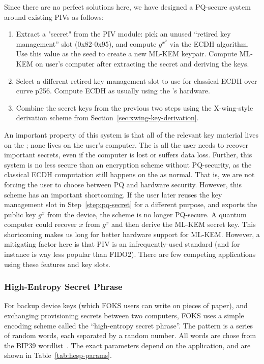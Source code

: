 Since there are no perfect solutions here, we have designed a PQ-secure system
around existing PIVs as follows:

\begin{enumerate}
  \item Extract a "secret" from the PIV module: pick an unused ``retired key management'' slot
  (0x82-0x95), and compute $g^{x^2}$ via the ECDH algorithm. Use this value as the seed
  to create a new ML-KEM keypair. Compute ML-KEM on user's computer after extracting the secret
  and deriving the keys.
  \label{step:pq-secret}

  \item Select a different retired key management slot to use for classical ECDH over curve p256.
  Compute ECDH as usually using the \yubi's hardware.

  \item  Combine the secret keys from the previous two steps using the X-wing-style
  derivation scheme from Section~\ref{sec:xwing-key-derivation}.
\end{enumerate}

An important property of this system is that all of the relevant key material
lives on the \yubi ; none lives on the user's computer. The \yubi is all the
user needs to recover important secrets, even if the computer is lost or suffers
data loss. Further, this system is no less secure than an encryption scheme
without PQ-security, as the classical ECDH computation still happens on the
\yubi{} as normal. That is, we are not forcing the user to choose between PQ and
hardware security.  However, this scheme has an important shortcoming. If the
user later reuses the key management slot in Step~\ref{step:pq-secret} for a
different purpose, and exports the public key $g^x$ from the device, the scheme
is no longer PQ-secure.  A quantum computer could recover $x$ from $g^x$ and
then derive the ML-KEM secret key.  This shortcoming makes us long for better
hardware support for ML-KEM.  However, a mitigating factor here is that PIV is
an infrequently-used standard (and for instance is way less popular than FIDO2).
There are few competing applications using these features and key slots.

\subsubsection{High-Entropy Secret Phrase}
\label{sec:hesp}

For backup device keys (which FOKS users can write on pieces of paper), and 
exchanging provisioning secrets between two computers, FOKS uses a simple
encoding scheme called the ``high-entropy secret phrase''. The pattern is 
a series of random words, each separated by a random number. All
words are chose from the BIP39 wordlist~\cite{bip39}. The exact
parameters depend on the application, and are shown in Table~\ref{tab:hesp-params}.

